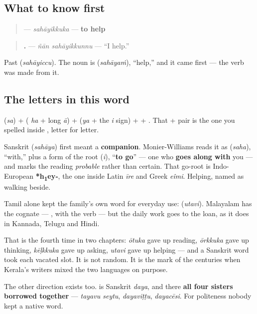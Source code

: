 \subsection*{What to know first}
\begin{quote}
\textbf{} — \emph{sahāyikkuka} — \textbf{to help}
\end{quote}

\begin{quote}
\textbf{ .} — \emph{ñān sahāyikkunnu} — \textquotedblleft{}I help.\textquotedblright{}
\end{quote}

Past \textbf{} (\emph{sahāyiccu}). The noun is \textbf{} (\emph{sahāyaṁ}), \textquotedblleft{}help,\textquotedblright{} and it came first — the verb was made from it.

\subsection*{The letters in this word}
\textbf{} (\emph{sa}) + \textbf{} (\textbf{} \emph{ha} + long \emph{ā}) + \textbf{} (\emph{ya} + the \emph{i} sign) + \textbf{} + \textbf{}. That \textbf{} + \textbf{} pair is the one you spelled inside \textbf{}, letter for letter.

\begin{cousinweb}
Sanskrit \textbf{} (\emph{sahāya}) first meant a \textbf{companion}. Monier-Williams reads it as \textbf{} (\emph{saha}), \textquotedblleft{}with,\textquotedblright{} plus a form of the root \textbf{} (\emph{i}), \textquotedblleft{}\textbf{to go}\textquotedblright{} — one who \textbf{goes along with} you — and marks the reading \emph{probable} rather than certain. That go-root is Indo-European \textbf{*h\textsubscript{1}ey‑}, the one inside Latin \emph{īre} and Greek \emph{eîmi}. Helping, named as walking beside.

Tamil alone kept the family's own word for everyday use: \textbf{} (\emph{utavi}). Malayalam has the cognate — \textbf{}, with the verb \textbf{} — but the daily work goes to the loan, as it does in Kannada, Telugu and Hindi.

That is the fourth time in two chapters: \emph{ōtuka} gave up reading, \emph{ōrkkuka} gave up thinking, \emph{kēḷkkuka} gave up asking, \emph{utavi} gave up helping — and a Sanskrit word took each vacated slot. It is not random. It is the mark of the centuries when Kerala's writers mixed the two languages on purpose.

The other direction exists too. \textbf{} is Sanskrit \emph{daya}, and there \textbf{all four sisters borrowed together} — \emph{tayavu seytu}, \emph{dayaviṭṭu}, \emph{dayacēsi}. For politeness nobody kept a native word.
\end{cousinweb}

